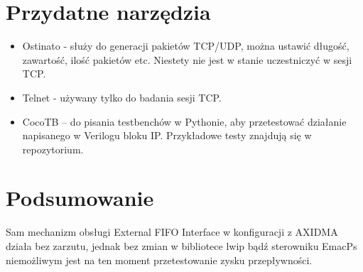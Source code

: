 \documentclass[11pt, letterpaper]{article}
\begin{document}
\section{Przydatne narzędzia}
\begin{itemize}
    \item Ostinato - służy do generacji pakietów TCP/UDP, można ustawić długość, zawartość, ilość pakietów etc. Niestety nie jest w stanie uczestniczyć w sesji TCP.
    \item Telnet - używany tylko do badania sesji TCP.
    \item CocoTB – do pisania testbenchów w Pythonie, aby przetestować działanie napisanego w Verilogu bloku IP. Przykładowe testy znajdują się w repozytorium.
\end{itemize}

\section{Podsumowanie}
Sam mechanizm obsługi External FIFO Interface w konfiguracji z AXIDMA działa bez zarzutu, jednak bez zmian w bibliotece lwip bądź sterowniku EmacPs niemożliwym jest na ten moment przetestowanie zysku przepływności.
\end{document}
